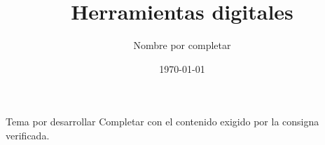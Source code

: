 \documentclass[aspectratio=169]{beamer}
\title[Herramientas digitales]{Herramientas digitales}
\author{Nombre por completar}
\institute[UAS]{Universidad Autonoma de Sinaloa\\Facultad de Contaduria y Administracion}
\date{\today}
\begin{document}
\begin{frame}
\titlepage
\end{frame}
\begin{frame}{Tema por desarrollar}
Completar con el contenido exigido por la consigna verificada.
\end{frame}
\end{document}
